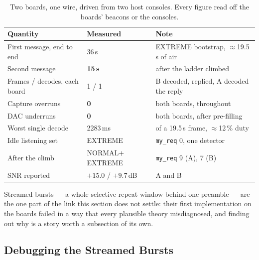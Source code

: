 \begin{table}[H]
    \centering
    \caption{Two boards, one wire, driven from two host consoles. Every
             figure read off the boards' beacons or the consoles.}
    \label{tab:radio}
    \small
    \begin{tabular}{@{}lll@{}}
    \toprule
    \textbf{Quantity} & \textbf{Measured} & \textbf{Note} \\
    \midrule
    First message, end to end & 36\,s & EXTREME bootstrap,
                                        $\approx$19.5\,s of air \\
    Second message            & \textbf{15\,s} & after the ladder
                                                 climbed \\
    Frames / decodes, each board & 1 / 1 & B decoded, replied, A decoded
                                           the reply \\
    Capture overruns          & \textbf{0} & both boards, throughout \\
    DAC underruns             & \textbf{0} & both boards, after
                                             pre-filling \\
    Worst single decode       & 2283\,ms & of a 19.5\,s frame,
                                           $\approx$12\,\% duty \\
    Idle listening set        & EXTREME & \texttt{my\_req} 0, one
                                          detector \\
    After the climb           & NORMAL$+$EXTREME & \texttt{my\_req} 9
                                                   (A), 7 (B) \\
    SNR reported              & $+15.0$ / $+9.7$\,dB & A and B \\
    \bottomrule
    \end{tabular}
\end{table}

Streamed bursts --- a whole selective-repeat window behind one
preamble --- are the one part of the link this section does not settle:
their first implementation on the boards failed in a way that every
plausible theory misdiagnosed, and finding out why is a story worth a
subsection of its own.

\subsection{Debugging the Streamed Bursts}
\label{sec:cport_burstdebug}

